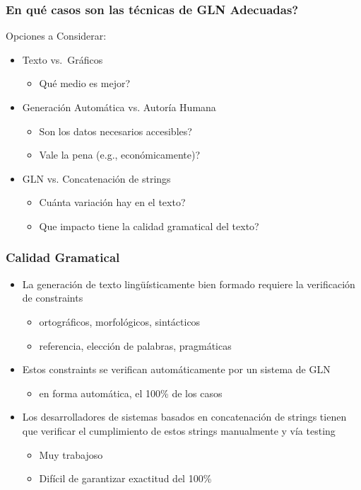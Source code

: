 \documentclass[compress,color=usenames]{beamer}
\begin{document}
\begin{frame}
\frametitle{En qu\'e casos son las t\'ecnicas de GLN Adecuadas?}

Opciones a Considerar:

\begin{itemize}
\item { {Texto vs.\ Gr\'aficos}}
\begin{itemize}
\item Qu\'e medio es mejor?
\end{itemize}
\item { {Generaci\'on Autom\'atica vs. Autor\'ia Humana}}
\begin{itemize}
\item Son los datos necesarios accesibles? 
\item Vale la pena (e.g., econ\'omicamente)?
\end{itemize}
\item { {GLN vs. Concatenaci\'on de strings}}
\begin{itemize}
\item Cu\'anta variaci\'on hay en el texto?
\item Que impacto tiene la calidad gramatical del texto? 
\end{itemize}
\end{itemize}

\end{frame}

\begin{frame}
\frametitle{Calidad Gramatical}

\begin{itemize}
\item La generaci\'on de texto ling\"u\'isticamente bien formado requiere la verificaci\'on de constraints
\begin{itemize}
\item ortogr\'aficos, morfol\'ogicos, sint\'acticos
\item referencia, elecci\'on de palabras, pragm\'aticas
\end{itemize}
\item Estos constraints se verifican autom\'aticamente por un sistema de GLN
\begin{itemize}
\item en forma autom\'atica, el 100\% de los casos
\end{itemize}
\item Los desarrolladores de sistemas basados en concatenaci\'on de strings tienen que verificar
 el cumplimiento de estos strings manualmente y v\'ia testing
\begin{itemize}
\item Muy trabajoso
\item Dif\'icil de garantizar exactitud del 100\%
\end{itemize}
\end{itemize}

\end{frame}
\end{document}
